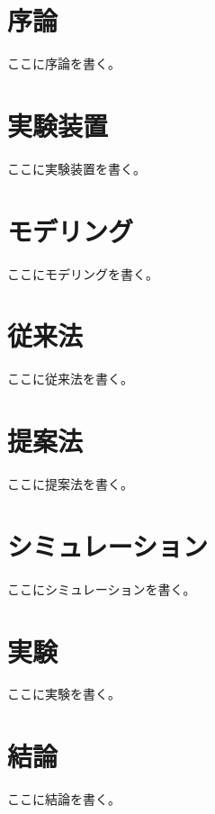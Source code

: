 \documentclass[11pt,a4paper,oneside,onecolumn,fleqn,dvipdfmx]{jsarticle}
\begin{document}
\thispagestyle{empty}
\begin{center}
    \vspace*{20pt}
    {\fontsize{60pt}{0pt}\selectfont{卒業論文}}
    \vskip 60pt
    {\fontsize{40pt}{0pt}\selectfont{題目}}
    \vskip 60pt
    {\fontsize{30pt}{0pt}\selectfont{yyyy年mm月dd日 \ 提出}}
    \vskip 60pt
    {\fontsize{30pt}{0pt}\selectfont{指導教員名 教授}}
    \vskip 60pt
    {\fontsize{30pt}{0pt}\selectfont{電気電子工学科}}
    \vskip 40pt
    {\fontsize{30pt}{0pt}\selectfont{00-000000\ \ 名前}}
\end{center}
\clearpage

\tableofcontents
\clearpage

\listoffigures
\listoftables
\clearpage

\section{序論}
ここに序論を書く。

\section{実験装置}
ここに実験装置を書く。

\section{モデリング}
ここにモデリングを書く。

\section{従来法}
ここに従来法を書く。

\section{提案法}
ここに提案法を書く。

\section{シミュレーション}
ここにシミュレーションを書く。

\section{実験}
ここに実験を書く。

\section{結論}
ここに結論を書く。



\end{document}
